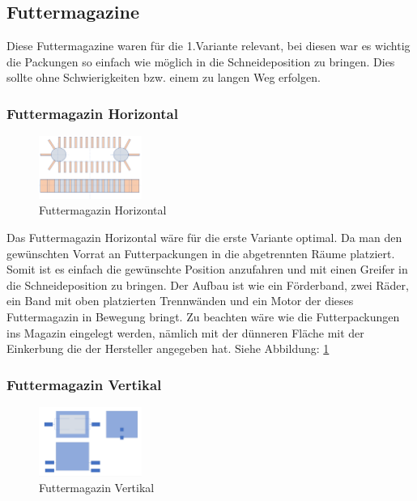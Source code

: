 \subsection{Futtermagazine}

Diese Futtermagazine waren für die 1.Variante relevant, bei diesen war es wichtig die Packungen so einfach wie möglich in die Schneideposition zu bringen. Dies sollte ohne Schwierigkeiten bzw. einem zu langen Weg erfolgen. 

\subsubsection{Futtermagazin Horizontal}

\begin{figure}
\vspace{-40pt}
  \begin{center}
    \includegraphics[width=0.30\textwidth]{Bilder/Powerpoint/Futtermagazin_horizontal}
  \end{center}
  \caption{Futtermagazin Horizontal}
  \label{Magazin Horizontal}
  \vspace{-10pt}
\end{figure} 

Das Futtermagazin Horizontal wäre für die erste Variante optimal. Da man den gewünschten Vorrat an Futterpackungen in die abgetrennten Räume platziert. Somit ist es einfach die gewünschte Position anzufahren und mit einen Greifer in die Schneideposition zu bringen. Der Aufbau ist wie ein Förderband, zwei Räder, ein Band mit oben platzierten Trennwänden und ein Motor der dieses Futtermagazin in Bewegung bringt. Zu beachten wäre wie die Futterpackungen ins Magazin eingelegt werden, nämlich mit der dünneren Fläche mit der Einkerbung die der Hersteller angegeben hat. Siehe Abbildung: \ref{Magazin Horizontal}

\subsubsection{Futtermagazin Vertikal}

\begin{figure}
\vspace{-40pt}
  \begin{center}
    \includegraphics[width=0.3\textwidth]{Bilder/Powerpoint/Futtermagazin_vertikal}
  \end{center}
  \caption{Futtermagazin Vertikal}
  \label{Magazin Vertikal}
  \vspace{-10pt}
\end{figure}

